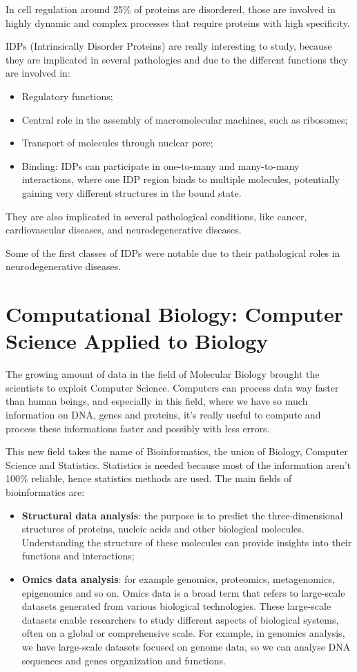 In cell regulation around 25\% of proteins are disordered, those are involved in highly dynamic and complex processes that require proteins with high specificity.

IDPs (Intrinsically Disorder Proteins) are really interesting to study, because they are implicated in several pathologies and due to the different functions they are involved in:
\begin{itemize}
	\item Regulatory functions;
	\item Central role in the assembly of macromolecular machines, such as ribosomes;
	\item Transport of molecules through nuclear pore;
	\item Binding: IDPs can participate in one-to-many and many-to-many interactions, where one IDP region binds to multiple molecules, potentially gaining very different structures in the bound state.
\end{itemize}
 They are also implicated in several pathological conditions, like cancer, cardiovascular diseases, and neurodegenerative diseases. 

Some of the first classes of IDPs were notable due to their pathological roles in neurodegenerative diseases.

\vspace{20em}

\pagebreak

\section{Computational Biology: Computer Science Applied to Biology}
The growing amount of data in the field of Molecular Biology brought the scientists to exploit Computer Science. Computers can process data way faster than human beings, and especially in this field, where we have so much information on DNA, genes and proteins, it's really useful to compute and process these informations faster and possibly with less errors.

This new field takes the name of Bioinformatics, the union of Biology, Computer Science and Statistics. Statistics is needed because most of the information aren't 100\% reliable, hence statistics methods are used.
The main fields of bioinformatics are:
\begin{itemize}
    \item \textbf{Structural data analysis}: the purpose is to predict the three-dimensional structures of proteins, nucleic acids and other biological molecules. Understanding the structure of these molecules can provide insights into their functions and interactions;
    \item \textbf{Omics data analysis}: for example genomics, proteomics, metagenomics, epigenomics and so on. Omics data is a broad term that refers to large-scale datasets generated from various biological technologies. These large-scale datasets enable researchers to study different aspects of biological systems, often on a global or comprehensive scale. For example, in genomics analysis, we have large-scale datasets focused on genome data, so we can analyse DNA sequences and genes organization and functions.
\end{itemize}

